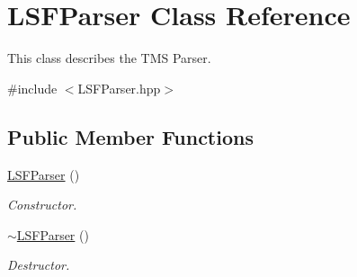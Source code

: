 \hypertarget{classLSFParser}{
\section{LSFParser Class Reference}
\label{classLSFParser}
}


This class describes the TMS Parser.  




{\ttfamily \#include $<$LSFParser.hpp$>$}

\subsection*{Public Member Functions}
\begin{DoxyCompactItemize}
\item 
\hypertarget{classLSFParser_aa69df5c03fef98020646c72bce099b85}{
\hyperlink{classLSFParser_aa69df5c03fef98020646c72bce099b85}{LSFParser} ()}
\label{classLSFParser_aa69df5c03fef98020646c72bce099b85}

\begin{DoxyCompactList}\small\item\em Constructor. \item\end{DoxyCompactList}\item 
\hypertarget{classLSFParser_aec23d81a29c6b2dd3f3af2b8abb16f95}{
\hyperlink{classLSFParser_aec23d81a29c6b2dd3f3af2b8abb16f95}{$\sim$LSFParser} ()}
\label{classLSFParser_aec23d81a29c6b2dd3f3af2b8abb16f95}

\begin{DoxyCompactList}\small\item\em Destructor. \item\end{DoxyCompactList}\end{DoxyCompactItemize}
